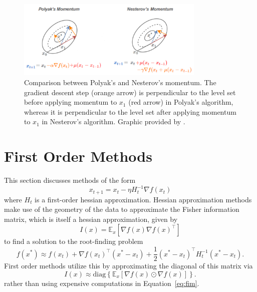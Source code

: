 \documentclass{article}
\begin{document}
\begin{figure}[t]
    \centering
    \includegraphics[width=0.8\textwidth]{sc1.png}
    \caption{Comparison between
    Polyak’s and Nesterov’s momentum. The gradient descent step (orange arrow)
    is perpendicular to the level set before applying momentum to $x_1$ (red
    arrow) in Polyak’s algorithm, whereas it is perpendicular to the level set
    after applying momentum to $x_1$ in Nesterov’s algorithm. Graphic provided by \citeauthor{nesterovnotes}.}
    \label{fig:sc1-png}
\end{figure}

\section{First Order Methods}

This section discusses methods of the form 
\begin{equation}
    x_{t + 1} = x_t - \eta H_t^{-1} \nabla f(x_t)
\end{equation}
where $H_t$ is a first-order hessian approximation.  Hessian approximation
methods make use of the geometry of the data to approximate the Fisher
information matrix, which is itself a hessian approximation, given by 
\begin{equation}
    \label{eq:fim}
    I(x) = \mathbb E_x \left[ \nabla f(x) \nabla {f(x)}^\intercal \right]
\end{equation}
to find a solution to the root-finding problem
\begin{equation}
    f(x^*) \approx f(x_t) + \nabla {f(x_t)}^\intercal (x^* - x_t) + \frac 1 2 {(x^* -
    x_t)}^\intercal H_t^{-1} (x^* - x_t).
\end{equation}
First order methods utilize this by approximating the diagonal of this matrix
via
\begin{equation}
    I(x) \approx \text{diag} \left\{ \mathbb E_x \left[ \nabla f(x) \odot \nabla
    {f(x)} \right] \right\}.
\end{equation}
rather than using expensive computations in Equation~\ref{eq:fim}.
\end{document}
